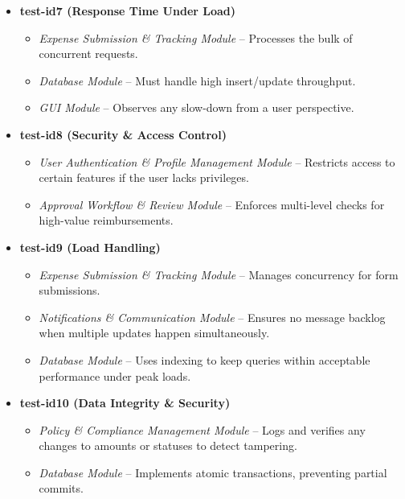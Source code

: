 \documentclass[12pt, titlepage]{article}
\begin{document}
\begin{itemize}
  \item \textbf{test-id7 (Response Time Under Load)}
    \begin{itemize}
      \item \emph{Expense Submission \& Tracking Module} – Processes the bulk of concurrent requests.
      \item \emph{Database Module} – Must handle high insert/update throughput.
      \item \emph{GUI Module} – Observes any slow-down from a user perspective.
    \end{itemize}

  \item \textbf{test-id8 (Security \& Access Control)}
    \begin{itemize}
      \item \emph{User Authentication \& Profile Management Module} – Restricts access to certain features if the user lacks privileges.
      \item \emph{Approval Workflow \& Review Module} – Enforces multi-level checks for high-value reimbursements.
    \end{itemize}

  \item \textbf{test-id9 (Load Handling)}
    \begin{itemize}
      \item \emph{Expense Submission \& Tracking Module} – Manages concurrency for form submissions.
      \item \emph{Notifications \& Communication Module} – Ensures no message backlog when multiple updates happen simultaneously.
      \item \emph{Database Module} – Uses indexing to keep queries within acceptable performance under peak loads.
    \end{itemize}

  \item \textbf{test-id10 (Data Integrity \& Security)}
    \begin{itemize}
      \item \emph{Policy \& Compliance Management Module} – Logs and verifies any changes to amounts or statuses to detect tampering.
      \item \emph{Database Module} – Implements atomic transactions, preventing partial commits.
    \end{itemize}
\end{itemize}
\end{document}
